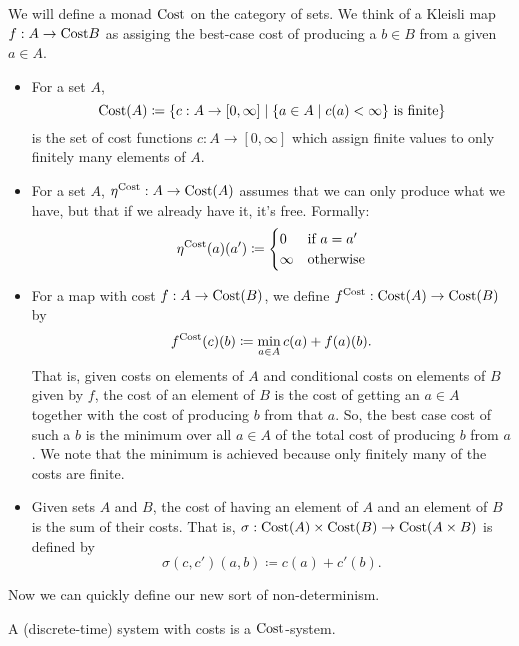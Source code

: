 \documentclass[DynamicalBook]{subfiles}
\begin{document}
\begin{definition}\label{def.cost_monad}
  We will define a monad $\mathrm{Cost}$ on the category of sets. We think of a Kleisli map $f : A \to \mathrm{Cost} B$ as
  assiging the best-case cost of producing a $b \in B$ from a given $a \in A$.   \begin{itemize}
  \item For a set $A$,
    \[
\mathrm{Cost}(A) \coloneqq \{c : A \to [0, \infty] \mid \mbox{$\{a \in A \mid c(a) <
  \infty\}$ is finite}\}
    \]
    is the set of cost functions $c : A \to [0, \infty]$ which assign finite
    values to only finitely many elements of $A$.
  \item For a set $A$, $\eta^{\mathrm{Cost}} : A \to \mathrm{Cost}(A)$ assumes that we
    can only produce what we have, but that if we already have it, it's free. Formally:
\[
\eta^{\mathrm{Cost}}(a)(a') \coloneqq \begin{cases} 0 &\mbox{if $a = a'$} \\
  \infty &\mbox{otherwise}\end{cases}
\]

  \item For a map with cost $f : A \to \mathrm{Cost}(B)$, we define
      $f^{\mathrm{Cost}} : \mathrm{Cost}(A) \to \mathrm{Cost}(B)$ by
      \[
f^{\mathrm{Cost}}(c)(b) \coloneqq \min_{a \in A} c(a) + f(a)(b).
      \]
That is, given costs on elements of $A$ and conditional costs on elements of $B$
given by $f$, the cost of an element of $B$ is the cost of getting an $a \in A$
together with the cost of producing $b$ from that $a$. So, the best case cost of
such a $b$ is the minimum over all $a \in A$ of the total cost of producing $b$
from $a$. We note that the minimum is achieved because only finitely many of the
costs are finite.
  \item Given sets $A$ and $B$, the cost of having an element of $A$ and an
    element of $B$ is the sum of their costs. That is, $\sigma : \mathrm{Cost}(A)
    \times \mathrm{Cost}(B) \to \mathrm{Cost}(A \times B)$ is defined by 
$$\sigma(c, c')(a, b) \coloneqq c(a) + c'(b).$$
  \end{itemize}
\end{definition}

Now we can quickly define our new sort of non-determinism.
\begin{definition}
A (discrete-time) system with costs is a $\mathrm{Cost}$-system.
\end{definition}
\end{document}
